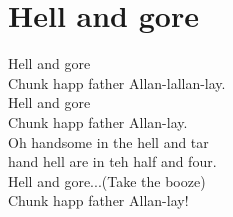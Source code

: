\section{Hell and gore}
Hell and gore\\
Chunk happ father Allan-lallan-lay.\\
Hell and gore\\
Chunk happ father Allan-lay.\\
Oh handsome in the hell and tar\\
hand hell are in teh half and four.\\
Hell and gore...(Take the booze)\\
Chunk happ father Allan-lay!\\